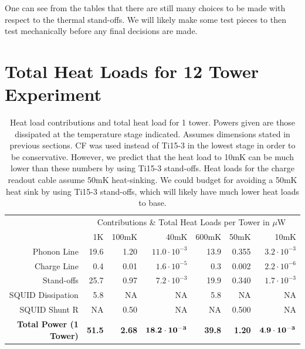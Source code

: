 \documentclass{report}
\begin{document}
One can see from the tables that there are still many choices to be made with respect to the thermal stand-offs. We will likely make some test pieces to then test mechanically before any final decisions are made.

\newpage
\section{Total Heat Loads for 12 Tower Experiment}
\begin{table}[h]
\begin{threeparttable}
\begin{tabular}{rrrr|rrr}
\toprule
 & \multicolumn{6}{c}{Contributions \& Total Heat Loads per Tower in $\mu$W} \\
  & 1K & 100mK & 40mK & 600mK & 50mK & 10mK \\
 \cmidrule(r){2-7}
   Phonon Line & 19.6 & 1.20 & $11.0 \cdot 10^{-3}$  & 13.9 & 0.355 & $3.2 \cdot 10^{-3}$ \\
   Charge Line & 0.4 & 0.01 & $1.6 \cdot 10^{-5} $ & 0.3 & 0.002  & $2.2 \cdot 10^{-6}$ \\
   Stand-offs & 25.7 & 0.97 & $7.2 \cdot 10^{-3}$ & 19.9 & 0.340 & $1.7 \cdot 10^{-3}$ \\
   SQUID Dissipation & 5.8 & NA & NA & 5.8 & NA & NA \\
   SQUID Shunt R & NA & 0.50 & NA & NA & 0.500 & NA \\
   \bf{Total Power (1 Tower)} & \bf{51.5} & \bf{2.68} & $ \bf{18.2 \cdot 10^{-3}}$ & \bf{39.8} & \bf{1.20} & $\bf{4.9 \cdot 10^{-3}}$ \\
  \bottomrule
\end{tabular}
\end{threeparttable}
\caption{Heat load contributions and total heat load for 1 tower. Powers given are those dissipated at the temperature stage indicated. Assumes dimensions stated in previous sections. CF was used instead of Ti15-3 in the lowest stage in order to be conservative. However, we predict that the heat load to 10mK can be much lower than these numbers by using Ti15-3 stand-offs. Heat loads for the charge readout cable assume 50mK heat-sinking. We could budget for avoiding a 50mK heat sink by using Ti15-3 stand-offs, which will likely have much lower heat loads to base. }
\end{table}
\end{document}
